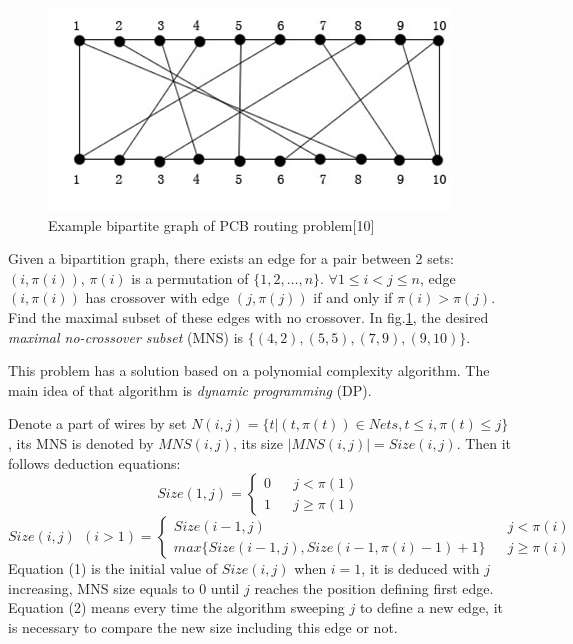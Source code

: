 \documentclass[11pt,twoside, onecolumn]{IEEEtran}
\begin{document}
\begin{figure}[hbt]
	\begin{center}
	\includegraphics[scale=0.4]{fig_pcb.png}
	\end{center}
	\caption{Example bipartite graph of PCB routing problem[10]}
	\label{fig:pcb}
\end{figure}

Given a bipartition graph, there exists an edge for a pair between 2 sets: $(i,\pi(i))$, $\pi(i)$
is a permutation of $\{1,2,\dots,n\}$. 
$\forall 1\leq i < j\leq n$, edge $(i,\pi(i))$ has crossover with edge $(j,\pi(j))$ if and only if
$\pi(i) > \pi(j)$.
Find the maximal subset of these edges with no crossover. In fig.\ref{fig:pcb}, the desired \emph{maximal no-crossover subset} (MNS) is $\{(4,2),(5,5),(7,9),(9,10)\}$.

This problem has a solution based on a polynomial complexity algorithm. The main idea of that algorithm
is \emph{dynamic programming} (DP).

Denote a part of wires by set $N(i,j) = \{t | (t, \pi(t)) \in Nets, t \leq i, \pi(t) \leq j \}$, its
MNS is denoted by $MNS(i,j)$, its size $|MNS(i,j)| = Size(i,j)$. Then it follows deduction equations:
\begin{equation}
 Size(1,j) = \left\{
\begin{array}{lcl}
0       &      & {j < \pi(1)}\\
1     &      & {j \geq \pi(1)}
\end{array} \right. 
\end{equation}
\begin{equation}
 Size(i,j)\ \ (i>1) = \left\{
\begin{array}{lcl}
Size(i-1,j)       &      & {j < \pi(i)}\\
max\{Size(i-1,j), Size(i-1,\pi(i)-1)+1\}     &      & {j \geq \pi(i)}
\end{array} \right. 
\end{equation}
Equation (1) is the initial value of $Size(i,j)$ when $i=1$, it is deduced with $j$ increasing, MNS size equals to 0 until $j$ reaches the position defining first edge. Equation (2) means every time the algorithm
sweeping $j$ to define a new edge, it is necessary to compare the new size including this edge or not.
\end{document}
